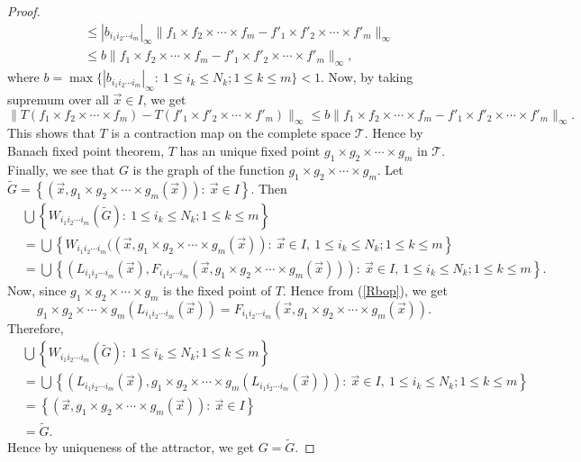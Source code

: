 \documentclass[10pt,a4paper]{amsart}
\newcommand{\myseries}[3]{#1\leq #2\leq #3}
\newcommand{\norm}[2]{\lVert #1 \rVert_#2}
\newcommand{\prodifs}[1]{#1_{i_1i_2\cdots i_m}}
\newcommand{\profunc}[1]{#1_1\times#1_2\times\cdots\times#1_m}
\begin{document}
\begin{proof}
\begin{align*}
			&\leq |\prodifs{b}|_{\infty}\norm{\profunc{f}-\profunc{f'}}{\infty}\\
			&\leq b \norm{\profunc{f}-\profunc{f'}}{\infty},
		\end{align*}
		where  $b=\max\{|\prodifs{b}|_{\infty}:~\myseries{1}{i_k}{N_k};\myseries{1}{k}{m}\}<1$. Now, by taking supremum over all $\vec{x}\in I$, we get
		$$\norm{T(\profunc{f})-T(\profunc{f'})}{\infty}\leq b \norm{\profunc{f}-\profunc{f'}}{\infty}.$$
		This shows that $T$ is a contraction map on the complete space $\mathscr{T}$. Hence by Banach fixed point theorem, $T$ has an unique fixed point $\profunc{g}$ in $\mathscr{T}$. Finally, we see that $G$ is the graph of the function $\profunc{g}$. Let $\tilde{G}=\left\{\left(\vec{x},\profunc{g}(\vec{x})\right):~\vec{x}\in I\right\}$. Then
		\begin{align*}
			&\bigcup\left\{\prodifs{W}(\tilde{G}):~\myseries{1}{i_k}{N_k};\myseries{1}{k}{m}\right\}\\
			&=\bigcup \left\{\prodifs{W}((\vec{x},\profunc{g}(\vec{x})):~\vec{x}\in I,~\myseries{1}{i_k}{N_k};\myseries{1}{k}{m} \right\}\\
			&=\bigcup\left\{\left(\prodifs{L}(\vec{x}),\prodifs{F}(\vec{x},\profunc{g}(\vec{x}))\right):~\vec{x}\in I,~\myseries{1}{i_k}{N_k};\myseries{1}{k}{m}\right\}.
		\end{align*}
		Now, since $\profunc{g}$ is the fixed point of $T$. Hence from (\ref{Rbop}), we get 
		$$\profunc{g}(\prodifs{L}(\vec{x}))=\prodifs{F}(\vec{x},\profunc{g}(\vec{x})).$$
		Therefore,
		\begin{align*}
			&\bigcup\left\{\prodifs{W}(\tilde{G}):~\myseries{1}{i_k}{N_k};\myseries{1}{k}{m}\right\}\\
			&=\bigcup\left\{\left(\prodifs{L}(\vec{x}),\profunc{g}(\prodifs{L}(\vec{x}))\right):~\vec{x}\in I,~\myseries{1}{i_k}{N_k};\myseries{1}{k}{m}\right\}\\	
			&=\left\{\left(\vec{x},\profunc{g}(\vec{x})\right):~\vec{x}\in I\right\}\\
			&=\tilde{G}.
		\end{align*}
		Hence by uniqueness of the attractor, we get $G=\tilde{G}$.
	\end{proof}
\end{document}
